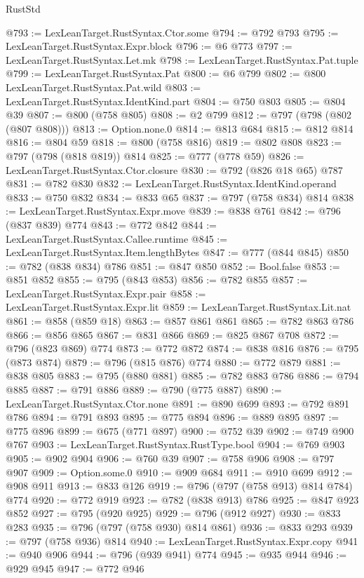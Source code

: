 \begin{lexlean}{RustStd}
\begin{coremodule}
@793 := LexLeanTarget.RustSyntax.Ctor.some
@794 := @792 @793
@795 := LexLeanTarget.RustSyntax.Expr.block
@796 := @6 @773
@797 := LexLeanTarget.RustSyntax.Let.mk
@798 := LexLeanTarget.RustSyntax.Pat.tuple
@799 := LexLeanTarget.RustSyntax.Pat
@800 := @6 @799
@802 := @800 LexLeanTarget.RustSyntax.Pat.wild
@803 := LexLeanTarget.RustSyntax.IdentKind.part
@804 := @750 @803
@805 := @804 @39
@807 := @800 (@758 @805)
@808 := @2 @799
@812 := @797 (@798 (@802 (@807 @808)))
@813 := Option.none.{0}
@814 := @813 @684
@815 := @812 @814
@816 := @804 @59
@818 := @800 (@758 @816)
@819 := @802 @808
@823 := @797 (@798 (@818 @819)) @814
@825 := @777 (@778 @59)
@826 := LexLeanTarget.RustSyntax.Ctor.closure
@830 := @792 (@826 @18 @65) @787
@831 := @782 @830
@832 := LexLeanTarget.RustSyntax.IdentKind.operand
@833 := @750 @832
@834 := @833 @65
@837 := @797 (@758 @834) @814
@838 := LexLeanTarget.RustSyntax.Expr.move
@839 := @838 @761
@842 := @796 (@837 @839) @774
@843 := @772 @842
@844 := LexLeanTarget.RustSyntax.Callee.runtime
@845 := LexLeanTarget.RustSyntax.Item.lengthBytes
@847 := @777 (@844 @845)
@850 := @782 (@838 @834) @786
@851 := @847 @850
@852 := Bool.false
@853 := @851 @852
@855 := @795 (@843 @853)
@856 := @782 @855
@857 := LexLeanTarget.RustSyntax.Expr.pair
@858 := LexLeanTarget.RustSyntax.Expr.lit
@859 := LexLeanTarget.RustSyntax.Lit.nat
@861 := @858 (@859 @18)
@863 := @857 @861 @861
@865 := @782 @863 @786
@866 := @856 @865
@867 := @831 @866
@869 := @825 @867 @708
@872 := @796 (@823 @869) @774
@873 := @772 @872
@874 := @838 @816
@876 := @795 (@873 @874)
@879 := @796 (@815 @876) @774
@880 := @772 @879
@881 := @838 @805
@883 := @795 (@880 @881)
@885 := @782 @883 @786
@886 := @794 @885
@887 := @791 @886
@889 := @790 (@775 @887)
@890 := LexLeanTarget.RustSyntax.Ctor.none
@891 := @890 @699
@893 := @792 @891 @786
@894 := @791 @893
@895 := @775 @894
@896 := @889 @895
@897 := @775 @896
@899 := @675 (@771 @897)
@900 := @752 @39
@902 := @749 @900 @767
@903 := LexLeanTarget.RustSyntax.RustType.bool
@904 := @769 @903
@905 := @902 @904
@906 := @760 @39
@907 := @758 @906
@908 := @797 @907
@909 := Option.some.{0}
@910 := @909 @684
@911 := @910 @699
@912 := @908 @911
@913 := @833 @126
@919 := @796 (@797 (@758 @913) @814 @784) @774
@920 := @772 @919
@923 := @782 (@838 @913) @786
@925 := @847 @923 @852
@927 := @795 (@920 @925)
@929 := @796 (@912 @927)
@930 := @833 @283
@935 := @796 (@797 (@758 @930) @814 @861)
@936 := @833 @293
@939 := @797 (@758 @936) @814
@940 := LexLeanTarget.RustSyntax.Expr.copy
@941 := @940 @906
@944 := @796 (@939 @941) @774
@945 := @935 @944
@946 := @929 @945
@947 := @772 @946

\end{coremodule}
\end{lexlean}
